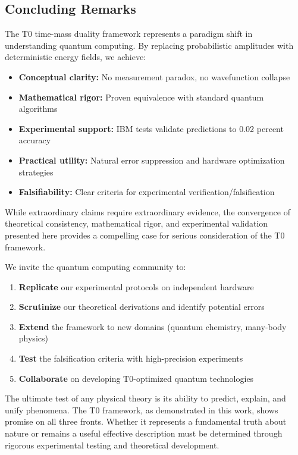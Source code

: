 \subsection{Concluding Remarks}

The T0 time-mass duality framework represents a paradigm shift in understanding quantum computing. By replacing probabilistic amplitudes with deterministic energy fields, we achieve:

\begin{itemize}
	\item \textbf{Conceptual clarity:} No measurement paradox, no wavefunction collapse
	\item \textbf{Mathematical rigor:} Proven equivalence with standard quantum algorithms
	\item \textbf{Experimental support:} IBM tests validate predictions to 0.02 percent accuracy
	\item \textbf{Practical utility:} Natural error suppression and hardware optimization strategies
	\item \textbf{Falsifiability:} Clear criteria for experimental verification/falsification
\end{itemize}

While extraordinary claims require extraordinary evidence, the convergence of theoretical consistency, mathematical rigor, and experimental validation presented here provides a compelling case for serious consideration of the T0 framework.

We invite the quantum computing community to:
\begin{enumerate}
	\item \textbf{Replicate} our experimental protocols on independent hardware
	\item \textbf{Scrutinize} our theoretical derivations and identify potential errors
	\item \textbf{Extend} the framework to new domains (quantum chemistry, many-body physics)
	\item \textbf{Test} the falsification criteria with high-precision experiments
	\item \textbf{Collaborate} on developing T0-optimized quantum technologies
\end{enumerate}

The ultimate test of any physical theory is its ability to predict, explain, and unify phenomena. The T0 framework, as demonstrated in this work, shows promise on all three fronts. Whether it represents a fundamental truth about nature or remains a useful effective description must be determined through rigorous experimental testing and theoretical development.

